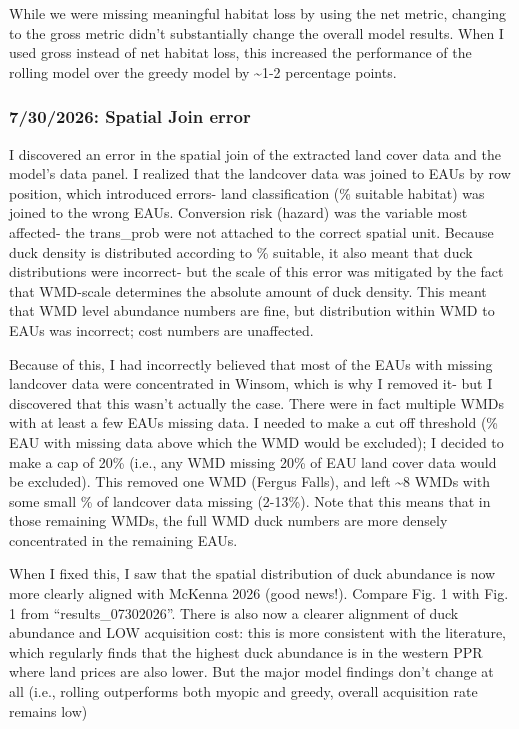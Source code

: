 \documentclass[
  letterpaper,
  DIV=11,
  numbers=noendperiod]{scrartcl}
\begin{document}
While we were missing meaningful habitat loss by using the net metric,
changing to the gross metric didn't substantially change the overall
model results. When I used gross instead of net habitat loss, this
increased the performance of the rolling model over the greedy model by
\textasciitilde1-2 percentage points.

\subsubsection{7/30/2026: Spatial Join error}\label{spatial-join-error}

I discovered an error in the spatial join of the extracted land cover
data and the model's data panel. I realized that the landcover data was
joined to EAUs by row position, which introduced errors- land
classification (\% suitable habitat) was joined to the wrong EAUs.
Conversion risk (hazard) was the variable most affected- the trans\_prob
were not attached to the correct spatial unit. Because duck density is
distributed according to \% suitable, it also meant that duck
distributions were incorrect- but the scale of this error was mitigated
by the fact that WMD-scale determines the absolute amount of duck
density. This meant that WMD level abundance numbers are fine, but
distribution within WMD to EAUs was incorrect; cost numbers are
unaffected.

Because of this, I had incorrectly believed that most of the EAUs with
missing landcover data were concentrated in Winsom, which is why I
removed it- but I discovered that this wasn't actually the case. There
were in fact multiple WMDs with at least a few EAUs missing data. I
needed to make a cut off threshold (\% EAU with missing data above which
the WMD would be excluded); I decided to make a cap of 20\% (i.e., any
WMD missing 20\% of EAU land cover data would be excluded). This removed
one WMD (Fergus Falls), and left \textasciitilde8 WMDs with some small
\% of landcover data missing (2-13\%). Note that this means that in
those remaining WMDs, the full WMD duck numbers are more densely
concentrated in the remaining EAUs.

When I fixed this, I saw that the spatial distribution of duck abundance
is now more clearly aligned with McKenna 2026 (good news!). Compare Fig.
1 with Fig. 1 from ``results\_07302026''. There is also now a clearer
alignment of duck abundance and LOW acquisition cost: this is more
consistent with the literature, which regularly finds that the highest
duck abundance is in the western PPR where land prices are also lower.
But the major model findings don't change at all (i.e., rolling
outperforms both myopic and greedy, overall acquisition rate remains
low)
\end{document}
